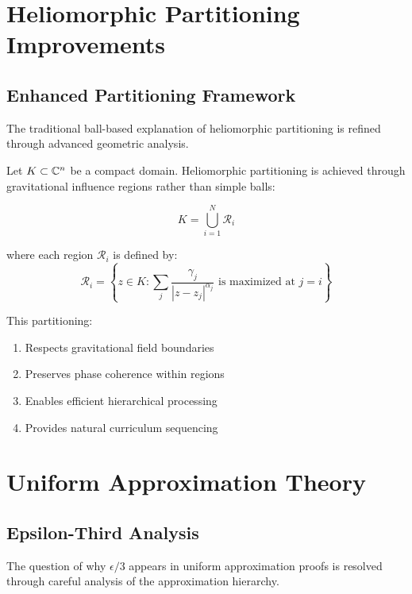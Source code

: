 \section{Heliomorphic Partitioning Improvements}

\subsection{Enhanced Partitioning Framework}

The traditional ball-based explanation of heliomorphic partitioning is refined through advanced geometric analysis.

\begin{theorem}
\label{thm:improved_partitioning}
Let $K \subset \mathbb{C}^n$ be a compact domain. Heliomorphic partitioning is achieved through gravitational influence regions rather than simple balls:

\begin{equation}
K = \bigcup_{i=1}^{N} \mathcal{R}_i
\end{equation}

where each region $\mathcal{R}_i$ is defined by:
\begin{equation}
\mathcal{R}_i = \left\{z \in K : \sum_{j} \frac{\gamma_j}{|z - z_j|^{\alpha_j}} \text{ is maximized at } j = i\right\}
\end{equation}

This partitioning:
\begin{enumerate}
    \item Respects gravitational field boundaries
    \item Preserves phase coherence within regions  
    \item Enables efficient hierarchical processing
    \item Provides natural curriculum sequencing
\end{enumerate}
\end{theorem}

\section{Uniform Approximation Theory}

\subsection{Epsilon-Third Analysis}

The question of why $\epsilon/3$ appears in uniform approximation proofs is resolved through careful analysis of the approximation hierarchy.

